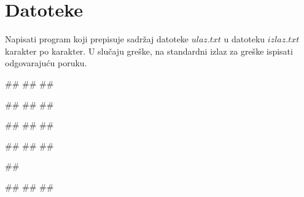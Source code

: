 \sstrana
\section{Datoteke}


\begin{Exercise}[label=v3_01] 
Napisati program koji prepisuje sadržaj datoteke $ulaz.txt$ u datoteku $izlaz.txt$ karakter po karakter.
U slučaju greške, na standardni izlaz za greške ispisati odgovarajuću poruku.

\begin{minitest}
\begin{upotreba}{1}
##
##
##

##
##
##
\end{upotreba}
\end{minitest}
\begin{minitest}
\begin{upotreba}{2}
##
##
##

##
##
##
\end{upotreba}
\end{minitest}
\begin{minitest}
\begin{upotreba}{3}
##

#\naslovIzlazZaGresku#
##
##
\end{upotreba}
\end{minitest}
\end{Exercise}
\begin{Answer}[ref=v3_01]
\end{Answer}


